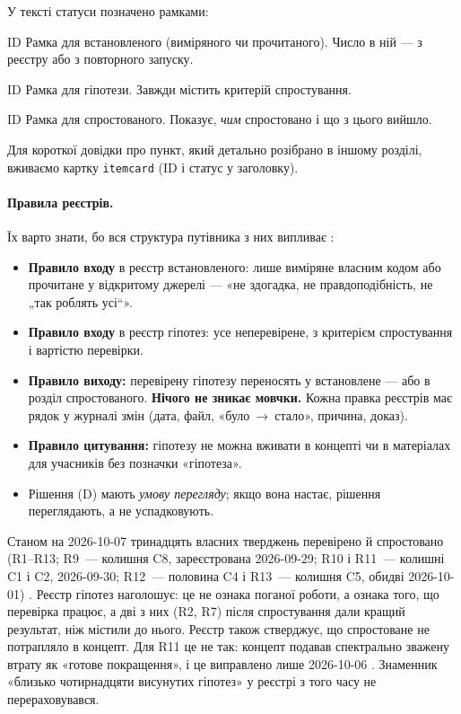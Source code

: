 У тексті статуси позначено рамками:
\begin{established}{ID}
Рамка для встановленого (виміряного чи прочитаного). Число в ній --- з реєстру або з
повторного запуску.
\end{established}
\begin{conjecture}{ID}
Рамка для гіпотези. Завжди містить критерій спростування.
\end{conjecture}
\begin{refuted}{ID}
Рамка для спростованого. Показує, \emph{чим} спростовано і що з цього вийшло.
\end{refuted}
\noindent Для короткої довідки про пункт, який детально розібрано в іншому розділі,
вживаємо картку \texttt{itemcard} (ID і статус у заголовку).

\paragraph{Правила реєстрів.} Їх варто знати, бо вся структура путівника з них випливає
\cite{RegEst,RegConj}:
\begin{itemize}
\item \textbf{Правило входу} в реєстр встановленого: лише виміряне власним кодом або
  прочитане у відкритому джерелі --- «не здогадка, не правдоподібність, не „так роблять
  усі“».
\item \textbf{Правило входу} в реєстр гіпотез: усе неперевірене, з критерієм
  спростування і вартістю перевірки.
\item \textbf{Правило виходу:} перевірену гіпотезу переносять у встановлене --- або в
  розділ спростованого. \textbf{Нічого не зникає мовчки.} Кожна правка реєстрів має
  рядок у журналі змін \cite{RegLog} (дата, файл, «було~→~стало», причина, доказ).
\item \textbf{Правило цитування:} гіпотезу не можна вживати в концепті чи в матеріалах
  для учасників без позначки «гіпотеза».
\item Рішення (D) мають \emph{умову перегляду}; якщо вона настає, рішення переглядають,
  а не успадковують.
\end{itemize}
Станом на 2026-10-07 тринадцять власних тверджень перевірено й спростовано (R1--R13; R9~--- колишня C8,
зареєстрована 2026-09-29; R10 і R11~--- колишні C1 і C2, 2026-09-30; R12~--- половина C4 і
R13~--- колишня C5, обидві 2026-10-01) \cite{RegEst,RegConj}. Реєстр гіпотез наголошує: це не ознака
поганої роботи, а ознака того, що перевірка працює, а дві з них (R2, R7) після спростування дали
кращий результат, ніж містили до нього. Реєстр також стверджує, що спростоване не потрапляло в
концепт. Для R11 це не так: концепт подавав спектрально зважену втрату як «готове покращення»,
і це виправлено лише 2026-10-06 \cite{RegLog}. Знаменник «близько чотирнадцяти висунутих
гіпотез» у реєстрі з того часу не перераховувався.

